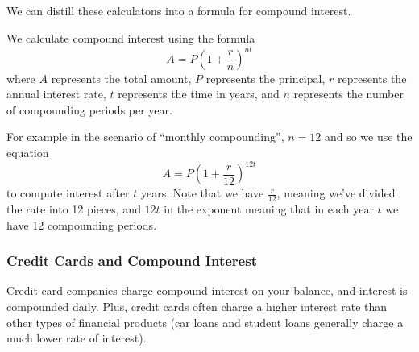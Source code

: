
We can distill these calculatons into a formula for compound interest.

\begin{boxeddef}
We calculate compound interest using the formula \[A = P\left(1+\frac{r}{n}\right)^{nt}\]
where $A$ represents the total amount, $P$ represents the principal, $r$ represents the annual interest rate, $t$ represents the time in years, and $n$ represents the number of compounding periods per year.
\end{boxeddef}

For example in the scenario of ``monthly compounding'', $n=12$ and so we use the equation \[A = P\left( 1 + \frac{r}{12}\right)^{12t}\] to compute interest after $t$ years. Note that we have $\frac{r}{12}$, meaning we've divided the rate into 12 pieces, and $12t$ in the exponent meaning that in each year $t$ we have 12 compounding periods.

\subsubsection{Credit Cards and Compound Interest}
	
Credit card companies charge compound interest on your balance, and interest is compounded daily. Plus, credit cards often charge a higher interest rate than other types of financial products (car loans and student loans generally charge a much lower rate of interest).

